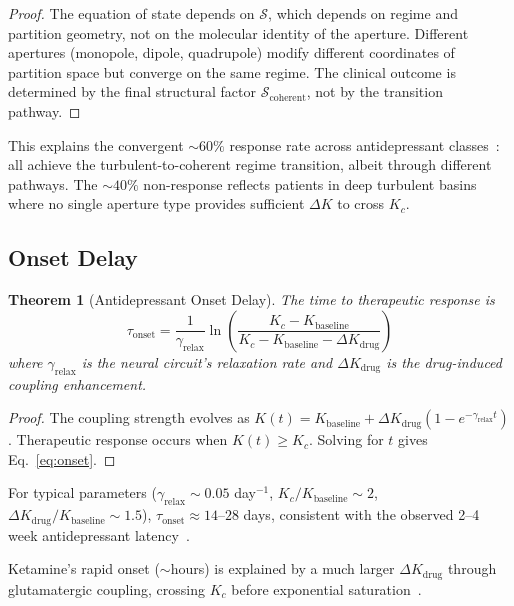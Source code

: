 \documentclass[twocolumn,10pt]{article}
\newtheorem{theorem}{Theorem}[section]
\theoremstyle{remark}
\begin{document}
\begin{proof}
The equation of state depends on $\mathcal{S}$, which depends on regime and partition geometry, not on the molecular identity of the aperture. Different apertures (monopole, dipole, quadrupole) modify different coordinates of partition space but converge on the same regime. The clinical outcome is determined by the final structural factor $\mathcal{S}_{\mathrm{coherent}}$, not by the transition pathway.
\end{proof}

This explains the convergent $\sim\!60\%$ response rate across antidepressant classes~\citep{cipriani2018comparative}: all achieve the turbulent-to-coherent regime transition, albeit through different pathways. The $\sim\!40\%$ non-response reflects patients in deep turbulent basins where no single aperture type provides sufficient $\Delta K$ to cross $K_c$.

\subsection{Onset Delay}

\begin{theorem}[Antidepressant Onset Delay]
\label{thm:onset}
The time to therapeutic response is
\begin{equation}
  \tau_{\mathrm{onset}} = \frac{1}{\gamma_{\mathrm{relax}}} \ln\left(\frac{K_c - K_{\mathrm{baseline}}}{K_c - K_{\mathrm{baseline}} - \Delta K_{\mathrm{drug}}}\right)
  \label{eq:onset}
\end{equation}
where $\gamma_{\mathrm{relax}}$ is the neural circuit's relaxation rate and $\Delta K_{\mathrm{drug}}$ is the drug-induced coupling enhancement.
\end{theorem}

\begin{proof}
The coupling strength evolves as $K(t) = K_{\mathrm{baseline}} + \Delta K_{\mathrm{drug}}(1 - e^{-\gamma_{\mathrm{relax}} t})$. Therapeutic response occurs when $K(t) \geq K_c$. Solving for $t$ gives Eq.~\eqref{eq:onset}.
\end{proof}

For typical parameters ($\gamma_{\mathrm{relax}} \sim 0.05$ day$^{-1}$, $K_c/K_{\mathrm{baseline}} \sim 2$, $\Delta K_{\mathrm{drug}}/K_{\mathrm{baseline}} \sim 1.5$), $\tau_{\mathrm{onset}} \approx 14$--$28$ days, consistent with the observed 2--4 week antidepressant latency~\citep{stahl2021essential}.

Ketamine's rapid onset ($\sim$hours) is explained by a much larger $\Delta K_{\mathrm{drug}}$ through glutamatergic coupling, crossing $K_c$ before exponential saturation~\citep{zarate2006randomized}.
\end{document}
